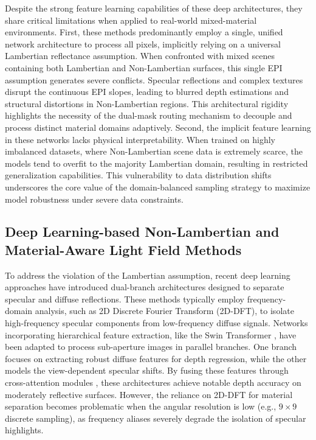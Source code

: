 \documentclass[lettersize,journal]{IEEEtran}
\begin{document}
Despite the strong feature learning capabilities of these deep architectures, they share critical limitations when applied to real-world mixed-material environments. First, these methods predominantly employ a single, unified network architecture to process all pixels, implicitly relying on a universal Lambertian reflectance assumption. When confronted with mixed scenes containing both Lambertian and Non-Lambertian surfaces, this single EPI assumption generates severe conflicts. Specular reflections and complex textures disrupt the continuous EPI slopes, leading to blurred depth estimations and structural distortions in Non-Lambertian regions. This architectural rigidity highlights the necessity of the dual-mask routing mechanism to decouple and process distinct material domains adaptively. Second, the implicit feature learning in these networks lacks physical interpretability. When trained on highly imbalanced datasets, where Non-Lambertian scene data is extremely scarce, the models tend to overfit to the majority Lambertian domain, resulting in restricted generalization capabilities. This vulnerability to data distribution shifts underscores the core value of the domain-balanced sampling strategy to maximize model robustness under severe data constraints.

\subsection{Deep Learning-based Non-Lambertian and Material-Aware Light Field Methods}

To address the violation of the Lambertian assumption, recent deep learning approaches have introduced dual-branch architectures designed to separate specular and diffuse reflections. These methods typically employ frequency-domain analysis, such as 2D Discrete Fourier Transform (2D-DFT), to isolate high-frequency specular components from low-frequency diffuse signals. Networks incorporating hierarchical feature extraction, like the Swin Transformer \cite{liu2021}, have been adapted to process sub-aperture images in parallel branches. One branch focuses on extracting robust diffuse features for depth regression, while the other models the view-dependent specular shifts. By fusing these features through cross-attention modules \cite{vaswani2017}, these architectures achieve notable depth accuracy on moderately reflective surfaces. However, the reliance on 2D-DFT for material separation becomes problematic when the angular resolution is low (e.g., $9 \times 9$ discrete sampling), as frequency aliases severely degrade the isolation of specular highlights.
\end{document}
